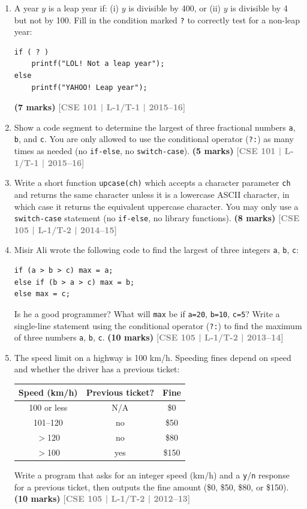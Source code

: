 \documentclass[12pt,a3paper]{article}
\newcommand{\yr}[1]{\hfill\textcolor{gray}{\small\textbf{[#1]}}}
\newcommand{\mk}[1]{\textcolor{orange!70!black}{\small\textbf{(#1 marks)}}}
\begin{document}
\begin{enumerate}
\item A year $y$ is a leap year if: (i) $y$ is divisible by 400, or (ii) $y$ is divisible by 4 but not by 100. Fill in the condition marked \texttt{?} to correctly test for a non-leap year:
 
\begin{lstlisting}
if ( ? )
    printf("LOL! Not a leap year");
else
    printf("YAHOO! Leap year");
\end{lstlisting}
\mk{7} \yr{CSE 101 | L-1/T-1 | 2015--16}

\item Show a code segment to determine the largest of three fractional numbers \texttt{a}, \texttt{b}, and \texttt{c}. You are only allowed to use the conditional operator (\texttt{?:}) as many times as needed (no \texttt{if-else}, no \texttt{switch-case}).
\mk{5} \yr{CSE 101 | L-1/T-1 | 2015--16}

\item Write a short function \texttt{upcase(ch)} which accepts a character parameter \texttt{ch} and returns the same character unless it is a lowercase ASCII character, in which case it returns the equivalent uppercase character. You may only use a \texttt{switch-case} statement (no \texttt{if-else}, no library functions).
\mk{8} \yr{CSE 105 | L-1/T-2 | 2014--15}

\item Misir Ali wrote the following code to find the largest of three integers \texttt{a}, \texttt{b}, \texttt{c}:
 
\begin{lstlisting}
if (a > b > c) max = a;
else if (b > a > c) max = b;
else max = c;
\end{lstlisting}
Is he a good programmer? What will \texttt{max} be if \texttt{a=20}, \texttt{b=10}, \texttt{c=5}? Write a single-line statement using the conditional operator (\texttt{?:}) to find the maximum of three numbers \texttt{a}, \texttt{b}, \texttt{c}.
\mk{10} \yr{CSE 105 | L-1/T-2 | 2013--14}

\item The speed limit on a highway is 100 km/h. Speeding fines depend on speed and whether the driver has a previous ticket:
\begin{center}
  \begin{tabular}{|c|c|c|}
    \hline
    \textbf{Speed (km/h)} & \textbf{Previous ticket?} & \textbf{Fine} \\ \hline
    100 or less & N/A & \$0 \\ \hline
    101--120 & no & \$50 \\ \hline
    $>$120 & no & \$80 \\ \hline
    $>$100 & yes & \$150 \\ \hline
  \end{tabular}
\end{center}
Write a program that asks for an integer speed (km/h) and a \texttt{y}/\texttt{n} response for a previous ticket, then outputs the fine amount (\$0, \$50, \$80, or \$150).
\mk{10} \yr{CSE 105 | L-1/T-2 | 2012--13}


\end{enumerate}
\end{document}
